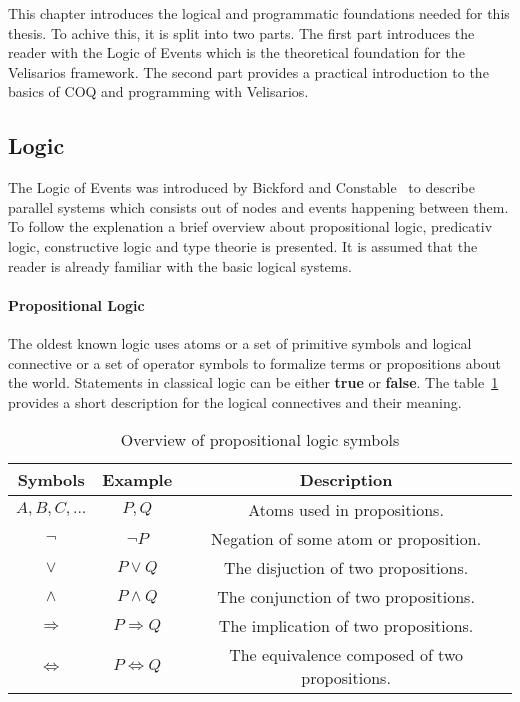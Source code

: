 This chapter introduces the logical and programmatic foundations needed for this
thesis. To achive this, it is split into two parts. The first part introduces
the reader with the Logic of Events which is the theoretical foundation for the
Velisarios framework. The second part provides a practical introduction to
the basics of COQ and programming with Velisarios.

\subsection{Logic}

The Logic of Events was introduced by Bickford and
Constable~\cite{bickford2003logic} to describe parallel systems which
consists out of nodes and events happening between them. To follow
the explenation a brief overview about propositional logic, predicativ logic,
constructive logic and type theorie is presented. It is assumed that the reader
is already familiar with the basic logical systems.

\paragraph{Propositional Logic}
The oldest known logic uses atoms or a set of primitive symbols and logical
connective or a set of operator symbols to formalize
terms or propositions about the world. Statements in classical logic can be either
\textbf{true} or \textbf{false}. The table~\ref{tab:proplogic} provides
a short description for the logical connectives and their meaning.~\cite{heinemann2013logik}

\begin{table}[h]
  \centering
  \begin{tabular}{c|c|c}
    Symbols & Example & Description\\\hline
    $A,B,C,...$ & $P, Q$ & Atoms used in propositions.\\
    $\neg$ & $\neg P$ & Negation of some atom or proposition.\\
    $\vee$ & $P \vee Q$ & The disjuction of two propositions.\\
    $\wedge$ & $P \wedge Q$ & The conjunction of two propositions.\\
    $\Rightarrow$ & $P \Rightarrow Q$ & The implication of two propositions.\\
    $\Leftrightarrow$ & $P \Leftrightarrow Q$ & The equivalence composed of two propositions.\\
  \end{tabular}
  \caption{Overview of propositional logic symbols}
  \label{tab:proplogic}
\end{table}

